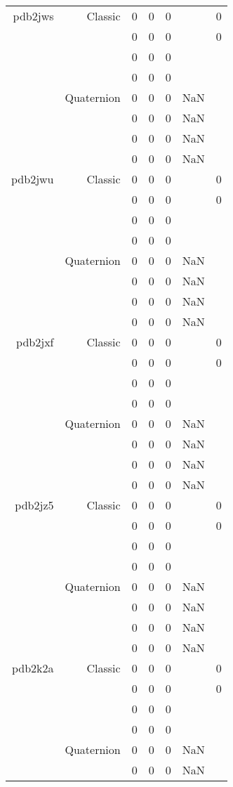 \begin{xltabular}{\textwidth}{r|rcccSc}
pdb2jws & Classic & 0 & 0 & 0 & & 0 \\
& & 0 & 0 & 0 & & 0 \\
& & 0 & 0 & 0 & & \\
& & 0 & 0 & 0 & & \\
& Quaternion & 0 & 0 & 0 & NaN & \\
& & 0 & 0 & 0 & NaN & \\
& & 0 & 0 & 0 & NaN & \\
& & 0 & 0 & 0 & NaN & \\ \addlinespace
pdb2jwu & Classic & 0 & 0 & 0 & & 0 \\
& & 0 & 0 & 0 & & 0 \\
& & 0 & 0 & 0 & & \\
& & 0 & 0 & 0 & & \\
& Quaternion & 0 & 0 & 0 & NaN & \\
& & 0 & 0 & 0 & NaN & \\
& & 0 & 0 & 0 & NaN & \\
& & 0 & 0 & 0 & NaN & \\ \addlinespace
pdb2jxf & Classic & 0 & 0 & 0 & & 0 \\
& & 0 & 0 & 0 & & 0 \\
& & 0 & 0 & 0 & & \\
& & 0 & 0 & 0 & & \\
& Quaternion & 0 & 0 & 0 & NaN & \\
& & 0 & 0 & 0 & NaN & \\
& & 0 & 0 & 0 & NaN & \\
& & 0 & 0 & 0 & NaN & \\ \addlinespace
pdb2jz5 & Classic & 0 & 0 & 0 & & 0 \\
& & 0 & 0 & 0 & & 0 \\
& & 0 & 0 & 0 & & \\
& & 0 & 0 & 0 & & \\
& Quaternion & 0 & 0 & 0 & NaN & \\
& & 0 & 0 & 0 & NaN & \\
& & 0 & 0 & 0 & NaN & \\
& & 0 & 0 & 0 & NaN & \\ \addlinespace
pdb2k2a & Classic & 0 & 0 & 0 & & 0 \\
& & 0 & 0 & 0 & & 0 \\
& & 0 & 0 & 0 & & \\
& & 0 & 0 & 0 & & \\
& Quaternion & 0 & 0 & 0 & NaN & \\
& & 0 & 0 & 0 & NaN & \\

\end{xltabular}
